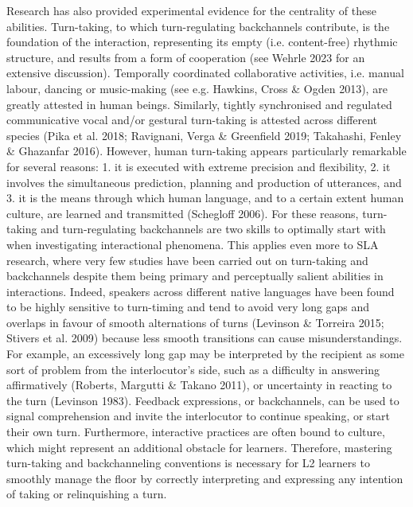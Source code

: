 \begin{styleStandard}
Research has also provided experimental evidence for the centrality of these abilities. Turn-taking, to which turn-regulating backchannels contribute, is the foundation of the interaction, representing its empty (i.e. content-free) rhythmic structure, and results from a form of cooperation (see Wehrle 2023 for an extensive discussion). Temporally coordinated collaborative activities, i.e. manual labour, dancing or music-making (see e.g. Hawkins, Cross \& Ogden 2013), are greatly attested in human beings. Similarly, tightly synchronised and regulated communicative vocal and/or gestural turn-taking is attested across different species (Pika et al. 2018; Ravignani, Verga \& Greenfield 2019; Takahashi, Fenley \& Ghazanfar 2016). However, human turn-taking appears particularly remarkable for several reasons: 1. it is executed with extreme precision and flexibility, 2. it involves the simultaneous prediction, planning and production of utterances, and 3. it is the means through which human language, and to a certain extent human culture, are learned and transmitted (Schegloff 2006). For these reasons, turn-taking and turn-regulating backchannels are two skills to optimally start with when investigating interactional phenomena. This applies even more to SLA research, where very few studies have been carried out on turn-taking and backchannels despite them being primary and perceptually salient abilities in interactions. Indeed, speakers across different native languages have been found to be highly sensitive to turn-timing and tend to avoid very long gaps and overlaps in favour of smooth alternations of turns (Levinson \& Torreira 2015; Stivers et al. 2009) because less smooth transitions can cause misunderstandings. For example, an excessively long gap may be interpreted by the recipient as some sort of problem from the interlocutor’s side, such as a difficulty in answering affirmatively (Roberts, Margutti \& Takano 2011), or uncertainty in reacting to the turn (Levinson 1983). Feedback expressions, or backchannels, can be used to signal comprehension and invite the interlocutor to continue speaking, or start their own turn. Furthermore, interactive practices are often bound to culture, which might represent an additional obstacle for learners. Therefore, mastering turn-taking and backchanneling conventions is necessary for L2 learners to smoothly manage the floor by correctly interpreting and expressing any intention of taking or relinquishing a turn.
\end{styleStandard}

